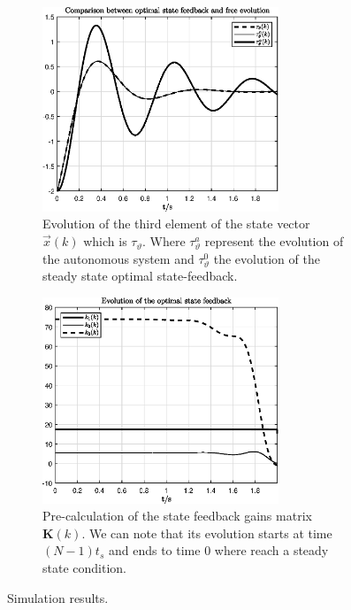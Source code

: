 \documentclass[11pt,a4paper,oneside]{book}
\numberwithin{equation}{section}
\theoremstyle{it}
\theoremstyle{definition}
\begin{document}
\begin{figure}[H]
	\centering
	\begin{subfigure}{.5\textwidth}
		\centering
		\includegraphics[width = 200pt, 
		keepaspectratio]{figures/optimal_control/state32.eps}
		\captionsetup{width=0.65\textwidth, font=footnotesize}
		\caption{Evolution of the third element of the state vector 
			$\vec{x}(k)$ which is $\tau_{\vartheta}$. Where $\tau_{\vartheta}^a$ 
			represent the evolution of the autonomous system and $\tau_{\vartheta}^0$ 
			the evolution of the steady state optimal state-feedback.}
		\label{figure_msm_opt_state_f_32}
	\end{subfigure}%
	\begin{subfigure}{.5\textwidth}
		\centering
		\includegraphics[width = 200pt, 
		keepaspectratio]{figures/optimal_control/feedback_m2.eps}
		\captionsetup{width=0.65\textwidth, font=footnotesize}
		\caption{Pre-calculation of the state feedback gains matrix 
			$\mathbf{K}(k)$. We can note that its evolution starts at time 
			$(N-1)t_s$ and ends to time $0$ where reach a steady state condition.}
		\label{figure_msm_opt_state_f_42}
	\end{subfigure}
	\caption{Simulation results.}
	\label{}
\end{figure}
\end{document}
